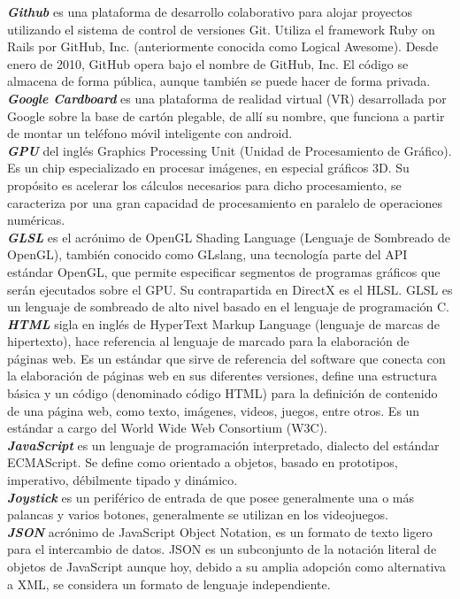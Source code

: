 \documentclass[12pt]{article}
\begin{document}
\textbf{\textit{Github}} es una plataforma de desarrollo colaborativo para alojar proyectos utilizando el sistema de control de versiones Git. Utiliza el framework Ruby on Rails por GitHub, Inc. (anteriormente conocida como Logical Awesome). Desde enero de 2010, GitHub opera bajo el nombre de GitHub, Inc. El código se almacena de forma pública, aunque también se puede hacer de forma privada.\\
\textbf{\textit{Google Cardboard}} es una plataforma de realidad virtual (VR) desarrollada por Google sobre la base de cartón plegable, de allí su nombre, que funciona a partir de montar un teléfono móvil inteligente con android.\\
\textbf{\textit{GPU}} del inglés Graphics Processing Unit (Unidad de Procesamiento de Gráfico). Es un chip especializado en procesar imágenes, en especial gráficos 3D. Su propósito es acelerar los cálculos necesarios para dicho procesamiento, se caracteriza por una gran capacidad de procesamiento en paralelo de operaciones numéricas.\\
\textbf{\textit{GLSL}}  es el acrónimo de OpenGL Shading Language (Lenguaje de Sombreado de OpenGL), también conocido como GLslang, una tecnología parte del API estándar OpenGL, que permite especificar segmentos de programas gráficos que serán ejecutados sobre el GPU. Su contrapartida en DirectX es el HLSL. GLSL es un lenguaje de sombreado de alto nivel basado en el lenguaje de programación C.\\
\textbf{\textit{HTML}}  sigla en inglés de HyperText Markup Language (lenguaje de marcas de hipertexto), hace referencia al lenguaje de marcado para la elaboración de páginas web. Es un estándar que sirve de referencia del software que conecta con la elaboración de páginas web en sus diferentes versiones, define una estructura básica y un código (denominado código HTML) para la definición de contenido de una página web, como texto, imágenes, videos, juegos, entre otros. Es un estándar a cargo del World Wide Web Consortium (W3C).\\
\textbf{\textit{JavaScript}} es un lenguaje de programación interpretado, dialecto del estándar ECMAScript. Se define como orientado a objetos, basado en prototipos, imperativo, débilmente tipado y dinámico.\\
\textbf{\textit{Joystick}} es un periférico de entrada de que posee generalmente una o más palancas y varios botones, generalmente se utilizan en los videojuegos.\\
\textbf{\textit{JSON}} acrónimo de JavaScript Object Notation, es un formato de texto ligero para el intercambio de datos. JSON es un subconjunto de la notación literal de objetos de JavaScript aunque hoy, debido a su amplia adopción como alternativa a XML, se considera un formato de lenguaje independiente.\\
\end{document}
